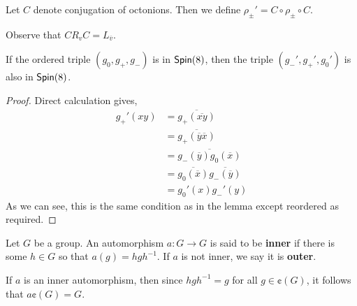 \begin{defn}
    Let $C$ denote conjugation of octonions. Then we define $\rho_{\pm}' = C\circ \rho_{\pm}\circ C$.
\end{defn}
\begin{remark*}
    Observe that $C R_v C =L_{\overline{v}}$.
\end{remark*}
\begin{lemma}
    If the ordered triple $(g_0,g_+,g_-)$ is in $\operatorname{\textsf{Spin}}(8)$, then the triple $(g_-',g_+',g_0')$ is also in $\operatorname{\textsf{Spin}}(8)$.
\end{lemma}
\begin{proof}
Direct calculation gives,
    \begin{align*}
g_+'(xy)&=\overline{g_+(\overline{xy})}\\&=\overline{g_+(\overline{y}\overline{x})}\\&=\overline{g_-(\overline{y})g_0(\overline{x})}\\
        &=\overline{g_0(\overline{x})}\overline{g_-(\overline{y})}\\&= g_0'(x)g_-'(y)
    \end{align*}
    As we can see, this is the same condition as in the lemma except reordered as required.
\end{proof}
\begin{defn}
Let $G$ be a group. An automorphism $a : G\to G$ is said to be \textbf{inner} if there is some $h\in G$ so that $a(g) = hgh^{-1}$. If $a$ is not inner, we say it is \textbf{outer}.
\end{defn}
\begin{remark*}
    If $a$ is an inner automorphism, then since $hgh^{-1}=g$ for all $g \in \cent(G)$, it follows that $a\cent(G) = G$.
\end{remark*}

